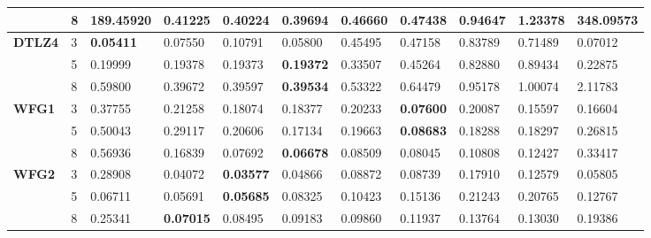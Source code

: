 \documentclass[conference]{IEEEtran}
\begin{document}
\begin{table*}[!htb]
\begin{tabular}{|l|l|l|l|l|l|l|l|l|l|l|}
		\textbf{}        & 8          & 189.45920        & 0.41225           & 0.40224               & \textbf{0.39694} & 0.46660             & 0.47438             & 0.94647            & 1.23378              & 348.09573        \\ \hline
		\textbf{DTLZ4}   & 3          & \textbf{0.05411} & 0.07550           & 0.10791               & 0.05800          & 0.45495             & 0.47158             & 0.83789            & 0.71489              & 0.07012          \\ \cline{2-11} 
		\textbf{}        & 5          & 0.19999          & 0.19378           & 0.19373               & \textbf{0.19372} & 0.33507             & 0.45264             & 0.82880            & 0.89434              & 0.22875          \\ \cline{2-11} 
		\textbf{}        & 8          & 0.59800          & 0.39672           & 0.39597               & \textbf{0.39534} & 0.53322             & 0.64479             & 0.95178            & 1.00074              & 2.11783          \\ \hline
		\textbf{WFG1}    & 3          & 0.37755          & 0.21258           & 0.18074               & 0.18377          & 0.20233             & \textbf{0.07600}    & 0.20087            & 0.15597              & 0.16604          \\ \cline{2-11} 
		\textbf{}        & 5          & 0.50043          & 0.29117           & 0.20606               & 0.17134          & 0.19663             & \textbf{0.08683}    & 0.18288            & 0.18297              & 0.26815          \\ \cline{2-11} 
		\textbf{}        & 8          & 0.56936          & 0.16839           & 0.07692               & \textbf{0.06678} & 0.08509             & 0.08045             & 0.10808            & 0.12427              & 0.33417          \\ \hline
		\textbf{WFG2}    & 3          & 0.28908          & 0.04072           & \textbf{0.03577}      & 0.04866          & 0.08872             & 0.08739             & 0.17910            & 0.12579              & 0.05805          \\ \cline{2-11} 
		\textbf{}        & 5          & 0.06711          & 0.05691           & \textbf{0.05685}      & 0.08325          & 0.10423             & 0.15136             & 0.21243            & 0.20765              & 0.12767          \\ \cline{2-11} 
		\textbf{}        & 8          & 0.25341          & \textbf{0.07015}  & 0.08495               & 0.09183          & 0.09860             & 0.11937             & 0.13764            & 0.13030              & 0.19386          \\ \hline

\end{tabular}
\end{table*}
\end{document}

